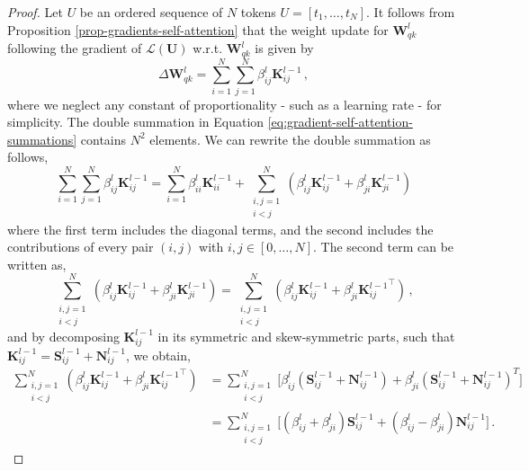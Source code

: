 \begin{proof}
%
%
Let $U$ be an ordered sequence of $N$ tokens $U = [t_1, \dots, t_N]$.
%
It follows from Proposition \ref{prop-gradients-self-attention} that the weight update for $\bm{W}_{qk}^l$ following the gradient of $\mathcal{L}(\bm{U})$ w.r.t. $\bm{W}_{qk}^l$ is given by
%
\begin{equation}
\label{eq:gradient-self-attention-summations}
    \Delta \bm{W}_{qk}^l = \sum_{i =1}^N \sum_{j=1}^N \beta^l_{ij} \bm{K}^{l-1}_{ij} \,,
\end{equation}
%
where we neglect any constant of proportionality - such as a learning rate - for simplicity.
%
The double summation in Equation \eqref{eq:gradient-self-attention-summations} contains $N^2$ elements.
%
We can rewrite the double summation as follows,
%
\begin{equation}
\sum_{i = 1}^N \sum_{j =1}^N \beta^l_{ij} \bm{K}^{l-1}_{ij} =
\sum_{i =1}^N \beta^l_{ii} \bm{K}^{l-1}_{ii} +
\sum_{\substack{i,j = 1 \\ i < j}}^N(\beta^l_{ij} \bm{K}^{l-1}_{ij} + \beta^l_{ji} \bm{K}^{l-1}_{ji})
\end{equation}
%
where the first term includes the diagonal terms, and the second includes the contributions of every pair $(i,j)$ with $i,j \in [0, \dots, N]$.
%
The second term can be written as,
%
\begin{equation}
 \sum_{\substack{i,j = 1 \\ i < j}}^N (\beta^l_{ij} \bm{K}^{l-1}_{ij} + \beta^l_{ji} \bm{K}^{l-1}_{ji}) = \sum_{\substack{i,j = 1 \\ i < j}}^N(\beta^l_{ij} \bm{K}^{l-1}_{ij} + \beta^l_{ji} {\bm{K}^{l-1}_{ij}}^\top) \,, 
\end{equation}
%
and by decomposing $\bm{K}^{l-1}_{ij}$ in its symmetric and skew-symmetric parts, such that $\bm{K}^{l-1}_{ij} = \bm{S}^{l-1}_{ij} + \bm{N}^{l-1}_{ij}$, we obtain,
%
\begin{equation}
\label{eq:gradients-symmetric-terms}
\begin{split}
    \sum_{\substack{i,j = 1 \\ i < j}}^N (\beta^l_{ij} \bm{K}^{l-1}_{ij} + \beta^l_{ji} {\bm{K}^{l-1}_{ij}}^\top)
    & = \sum_{\substack{i,j = 1 \\ i < j}}^N \big[ \beta_{ij}^l(\bm{S}^{l-1}_{ij} + \bm{N}^{l-1}_{ij}) + \beta_{ji}^l(\bm{S}^{l-1}_{ij} + \bm{N}^{l-1}_{ij})^T \big] \\
    & = \sum_{\substack{i,j = 1 \\ i < j}}^N \big[(\beta^l_{ij} + \beta^l_{ji})\bm{S}^{l-1}_{ij} + (\beta^l_{ij} - \beta^l_{ji})\bm{N}^{l-1}_{ij}\big]\,.

\end{split}
\end{equation}
\end{proof}
